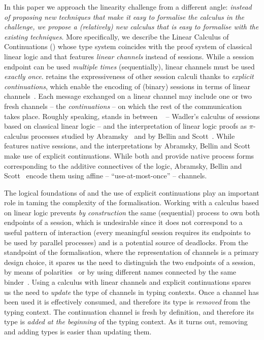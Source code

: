 In this paper we approach the linearity challenge from a different angle:
\emph{instead of proposing new techniques that make it easy to formalise the
calculus in the challenge, we propose a (relatively) new calculus that is easy
to formalise with the existing techniques}.
%
More specifically, we describe the Linear Calculus of Continuations (\LCC) whose
type system coincides with the proof system of classical linear logic and that
features \emph{linear channels} instead of sessions. While a session endpoint
can be used \emph{multiple times} (sequentially), linear channels must be used
\emph{exactly once}. \LCC retains the expressiveness of other session calculi
thanks to \emph{explicit continuations}, which enable the encoding of (binary)
sessions in terms of linear
channels~\citep{Kobayashi02b,DardhaGiachinoSangiorgi17}. Each message exchanged
on a linear channel may include one or two fresh channels -- the
\emph{continuations} -- on which the rest of the communication takes place.
%
Roughly speaking, \LCC stands in between \CP~\cite{Wadler14} -- Wadler's
calculus of sessions based on classical linear logic -- and the interpretation
of linear logic proofs as $\pi$-calculus processes studied by
Abramsky~\citep{Abramsky93} and by Bellin and Scott~\citep{BellinScott94}. While
\CP features native sessions, \LCC and the interpretations by Abramsky, Bellin
and Scott~\cite{Abramsky93,BellinScott94} make use of explicit continuations.
While both \CP and \LCC provide native process forms corresponding to the
additive connectives of the logic, Abramsky, Bellin and
Scott~\cite{Abramsky93,BellinScott94} encode them using affine --
``use-at-most-once'' -- channels.

The logical foundations of \LCC and the use of explicit continuations play an
important role in taming the complexity of the formalisation.
%
Working with a calculus based on linear logic prevents \emph{by construction}
the same (sequential) process to own both endpoints of a session, which is
undesirable since it does not correspond to a useful pattern of interaction
(every meaningful session requires its endpoints to be used by parallel
processes) and is a potential source of deadlocks.
%
From the standpoint of the formalisation, where the representation of channels
is a primary design choice, it spares us the need to distinguish the two
endpoints of a session, \eg by means of
polarities~\citep{GayHole05,ZalakainDardha21} or by using different names
connected by the same binder~\citep{Vasconcelos12,GayVasconcelos25}.
%
Using a calculus with linear channels and explicit continuations spares us the
need to \emph{update} the type of channels in typing contexts. Once a channel
has been used it is effectively consumed, and therefore its type is
\emph{removed} from the typing context. The continuation channel is fresh by
definition, and therefore its type is \emph{added at the beginning} of the
typing context. As it turns out, removing and adding types is easier than
updating them.

